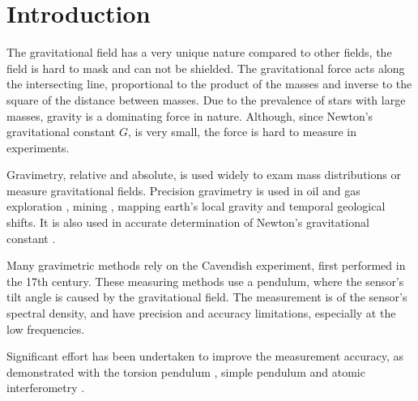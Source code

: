 \documentclass[\main/master.tex]{subfiles}
\begin{document}
\newspacing
\chapter{Introduction}\label{chapter:Introduction}


The gravitational field has a very unique nature compared to other fields, the field is hard to mask and can not be shielded. The gravitational force acts along the intersecting line, proportional to the product of the masses and inverse to the square of the distance between masses. Due to the prevalence of stars with large masses, gravity is a dominating force in nature. Although, since Newton's gravitational constant $G$, is very small, the force is hard to measure in experiments. 
\par\noindent
Gravimetry, relative and absolute, is used widely to exam mass distributions or measure gravitational fields. Precision gravimetry \cite{Wahr04,Bingham10,Bell98,Leeuwen00,Diorio03,Romaides01,Peters01,Luther82,Kuroda95,Karagioz96,Bagley97,Gundlach00,Quinn01,Armstrong03,Kleinevoss99,Parks10,Peters99,Mcguirk02,Dimopoulos07,Lamporesi08,Sorrentino10,Rosi14,Goodkind99} is used in oil and gas exploration \cite{Bell98}, mining \cite{Leeuwen00}, mapping earth's local gravity \cite{Wahr04,Bingham10} and temporal geological shifts. It is also used in accurate determination of Newton's gravitational constant \cite{Luther82, Kuroda95, Karagioz96, Bagley97, Gundlach00, Quinn01, Armstrong03, Kleinevoss99, Parks10, Peters99, Mcguirk02, Dimopoulos07, Lamporesi08, Sorrentino10, Rosi14}. 
\par\noindent
Many gravimetric methods rely on the Cavendish experiment, first performed in the 17th century. These measuring methods use a pendulum, where the sensor's tilt angle is caused by the gravitational field. The measurement is of the sensor's spectral density, and
have precision and accuracy limitations, especially at the low frequencies. 
\par\noindent
Significant effort has been undertaken to improve the measurement accuracy, as demonstrated with the torsion pendulum \cite{Luther82,Kuroda95,Karagioz96,Bagley97,Gundlach00,Quinn01,Armstrong03}, simple pendulum \cite {Kleinevoss99,Parks10} and atomic interferometry \cite{Lamporesi08,Sorrentino10,Rosi14}.
\iffalse
\end{document}

